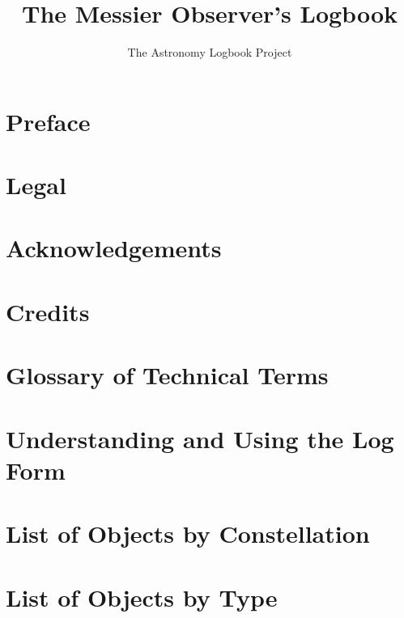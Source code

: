 \documentclass[a4paper,oneside]{book}
\begin{document}
\author{The Astronomy Logbook Project}
\title{\Huge The Messier Observer's Logbook}
\maketitle

\frontmatter
\tableofcontents

\chapter*{Preface}



\chapter{Legal}



\chapter{Acknowledgements}



\chapter{Credits}



\mainmatter

\chapter{Glossary of Technical Terms}



\chapter{Understanding and Using the Log Form}




\twocolumn
\chapter{List of Objects by Constellation}



\chapter{List of Objects by Type}
\end{document}

